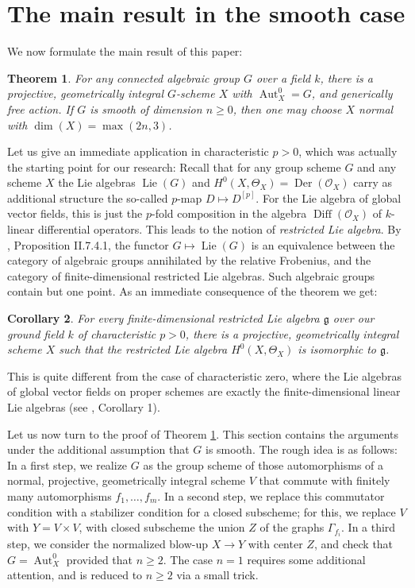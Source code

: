 \documentclass[oneside, 12pt]{amsart}
\newtheorem{theorem}{Theorem}[section]
\newtheorem{corollary}[theorem]{Corollary}
\theoremstyle{definition}
\theoremstyle{remark}
\newcommand{\catO}{\mathcal{O}}
\newcommand{\Aut}{\operatorname{Aut}}
\newcommand{\Der}{\operatorname{Der}}
\newcommand{\Diff}{\operatorname{Diff}}
\newcommand{\Lie}{\operatorname{Lie}}
\newcommand{\ra}{\rightarrow}
\newcommand{\lieg}{\mathfrak{g}}
\begin{document}
\section{The main result  in the  smooth case}
\label{sec:smooth}

We now  formulate  the main result of this paper:

\begin{theorem}
\label{thm:main}
For any connected algebraic group $G$ over a field $k$, there is a projective, 
geometrically integral $G$-scheme $X$ with $\Aut_X^0= G$, and generically free 
action.  If $G$ is smooth of dimension $n\geq 0$, then one may choose  
$X$ normal with $\dim(X)=\max(2n,3)$.
\end{theorem}

Let us give an immediate application in characteristic $p>0$, which was actually the starting point for our research:
Recall that for any group scheme $G$ and any scheme $X$
the Lie algebras $\Lie(G)$ and $H^0(X,\Theta_X) = \Der(\catO_X)$ 
carry as additional structure the so-called $p$-map 
$D\mapsto D^{[p]}$. For the Lie algebra of global vector fields, 
this is just the $p$-fold composition in the  algebra 
$\Diff(\catO_X)$ of $k$-linear differential operators.
This leads to the notion of \emph{restricted Lie algebra}. 
By \cite{Demazure; Gabriel 1970}, Proposition II.7.4.1,  
the functor $G\mapsto \Lie(G)$ is an equivalence 
between the category of algebraic groups annihilated
by the relative Frobenius, and the category of finite-dimensional 
restricted Lie algebras. Such algebraic groups contain but one point. As an immediate
consequence of the theorem we get:

\begin{corollary}
\label{cor:lie algebra}
For every finite-dimensional restricted Lie algebra $\lieg$ over our ground field $k$ of characteristic $p>0$,
there is a  projective,  geometrically integral scheme $X$ such that the restricted Lie algebra $H^0(X,\Theta_X)$
is isomorphic to $\lieg$.
\end{corollary}

This is quite different from the case of characteristic zero,
where the Lie algebras of global vector fields on proper schemes
are exactly the finite-dimensional linear Lie algebras
(see \cite{Brion 2014}, Corollary 1).

Let us now turn to the proof of Theorem \ref{thm:main}.
This section contains the arguments  under the additional assumption 
that $G$ is smooth. The rough idea is as follows:
In a first step, we realize $G$ 
as the group scheme of those automorphisms of 
a normal, projective, geometrically integral 
scheme $V$ that  commute with finitely many 
automorphisms $f_1,\ldots, f_m$.
In a second step, we   replace 
this commutator condition with a stabilizer condition 
for  a closed subscheme;
for this, we replace $V$ with $Y = V \times V$, with
closed subscheme the union $Z$ of the graphs
$\Gamma_{f_i}$. 
In a third step, we consider the normalized blow-up $X\ra Y$ 
with center $Z$, and check that $G= \Aut^0_X$ provided 
that $n \geq 2$. The case $n=1$ requires some additional 
attention, and is reduced to $n\geq 2$  via a small trick. 
\end{document}

